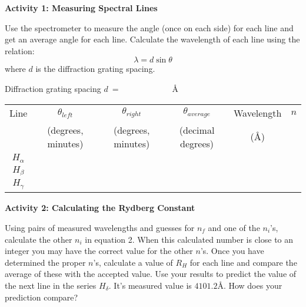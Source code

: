 \vspace{0.2in}

\textbf{Activity 1: Measuring Spectral Lines}

\bigskip
 
Use the spectrometer to measure the angle (once on each side) 
for each line and get an average angle for each line.  
Calculate the wavelength of each line using the relation:
\begin{equation}
\lambda = d \sin \theta
\end{equation}
where $d$ is the diffraction grating spacing.


\vspace{0.25in}

\noindent Diffraction grating spacing $d ~ = ~\qquad\qquad\qquad${\AA}

\vspace{0.5in}

\begin{center}
\begin{tabular}{|c|c|c|c|c|c|}\hline
Line        & $\theta_{left}$     & $\theta_{right}$     & $\theta_{average}$ & Wavelength  & $n$ \\ 
            & (degrees, minutes)  &  (degrees, minutes)  & (decimal degrees)  & ({\AA}) &  \\ \hline
$H_\alpha$  &                             &                              &                    &                    &   \\ \hline
$H_\beta$   &                             &                              &                    &                    &   \\ \hline
$H_\gamma$  &                             &                              &                    &                    &   \\ \hline
\end{tabular}
\end{center}

\vspace{0.5in}

\textbf{Activity 2: Calculating the Rydberg Constant}

\bigskip
 
Using pairs of measured wavelengths and guesses for $n_f$ and one of the $n_i$'s, 
calculate the other $n_i$ in equation 2.  
When this calculated number is close to an integer you may have the correct value for the other $n$'s.
Once you have determined the proper $n$'s, calculate a value of $R_H$ for each line and compare the 
average of these with the accepted value.  
Use your results to predict the value of the next line in the series $H_\delta$.  
It's measured value is $4101.2${\AA}.  
How does your prediction compare?     

